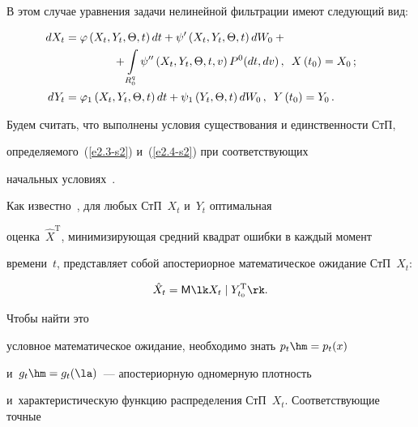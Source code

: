 В этом случае уравнения задачи нелинейной фильтрации имеют следующий вид:

    \begin{align}

    \hspace*{-10mm}dX_t &=\varphi \left(X_t, Y_t,\Theta, t\right)dt+\psi'

    \left(X_t, Y_t,\Theta, t\right)dW_0

+{}\notag\\

&\hspace*{15mm}{}+\int\limits_{R_0^q} \psi''\left(X_t, Y_t,\Theta, t,v\right) P^0 (dt, dv)\,,\enskip  

X\left(t_0\right) = X_0\,;\label{e2.3-s2}

\\

        \hspace*{-10mm}dY_t &=\varphi_1 \left(X_t, Y_t,\Theta, t\right)dt +\psi_1 \left(Y_t,\Theta, t\right) dW_0\,,\enskip 

    Y\left(t_0\right) = Y_0\,.\label{e2.4-s2}

\end{align}



Будем считать, что выполнены условия существования и единственности СтП, 

определяемого~(\ref{e2.3-s2}) и~(\ref{e2.4-s2}) при соответствующих 

начальных условиях~\cite{4-s2, 5-s2}.



Как известно~\cite{5-s2, 6-s2}, для любых СтП~$X_t$ и~$Y_t$ оптимальная 

оценка~$\hat X^{\mathrm{T}}$, минимизирующая средний квадрат ошибки в каждый момент 

времени~$t$, представляет собой апостериорное математическое ожидание СтП~$X_t$: 

$$

\hat X_t = {\sf M} \lk X_t \mid Y_{t_0}^{\mathrm{T}}\rk.

$$

Чтобы найти это 

условное математическое ожидание, необходимо знать $p_t \hm= p_t (x)$ 

и~$g_t\hm=g_t(\la)$~--- апостериорную одномерную плотность 

и~характеристическую функцию распределения СтП~$X_t$. Соответствующие точные 

